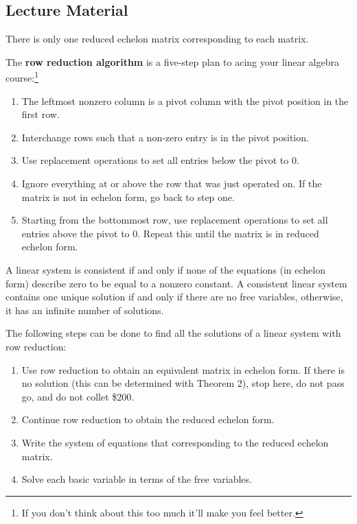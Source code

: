 \documentclass{article}
\begin{document}
\subsection{Lecture Material}

\begin{theorem}
There is only one reduced echelon matrix corresponding to each matrix.
\end{theorem}

The \textbf{row reduction algorithm} is a five-step plan to acing your linear
algebra course:\footnote{If you don't think about this too much it'll make you feel better.}

\begin{enumerate}

\item
The leftmost nonzero column is a pivot column with the pivot position in the
first row.

\item
Interchange rows such that a non-zero entry is in the pivot position.

\item
Use replacement operations to set all entries below the pivot to 0.

\item
Ignore everything at or above the row that was just operated on. If the matrix
is not in echelon form, go back to step one.

\item
Starting from the bottommost row, use replacement operations to set all entries
above the pivot to 0. Repeat this until the matrix is in reduced echelon form.

\end{enumerate}

\begin{theorem}
A linear system is consistent if and only if none of the equations (in echelon
form) describe zero to be equal to a nonzero constant. A consistent linear
system contains one unique solution if and only if there are no free variables,
otherwise, it has an infinite number of solutions.
\end{theorem}

The following steps can be done to find all the solutions of a linear system
with row reduction:

\begin{enumerate}

\item
Use row reduction to obtain an equivalent matrix in echelon form. If there is
no solution (this can be determined with Theorem 2), stop here, do not pass go,
and do not collet \$200.

\item
Continue row reduction to obtain the reduced echelon form.

\item
Write the system of equations that corresponding to the reduced echelon matrix.

\item
Solve each basic variable in terms of the free variables.

\end{enumerate}
\end{document}
